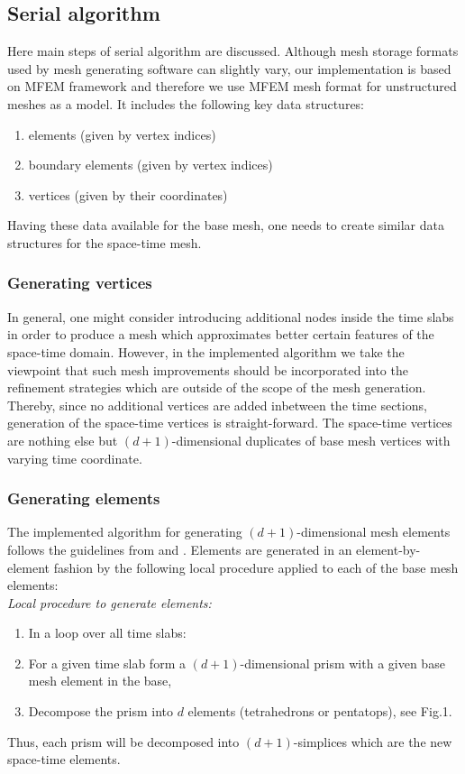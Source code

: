 \documentclass[12pt]{article}
\begin{document}
\subsection{Serial algorithm}
Here main steps of serial algorithm are discussed. Although mesh storage formats used by mesh generating software can slightly vary, our implementation is based on MFEM \cite{mfem} framework and therefore we use MFEM mesh format for unstructured meshes as a model. It includes the following key data structures: 
\begin{enumerate}
\item elements (given by vertex indices)
\item boundary elements (given by vertex indices)
\item vertices (given by their coordinates)
\end{enumerate}
Having these data available for the base mesh, one needs to create similar data structures for the space-time mesh. 

\subsubsection{Generating vertices}
In general, one might consider introducing additional nodes inside the time slabs \cite{Behr} in order to produce a mesh which approximates better certain features of the space-time domain. However, in the implemented algorithm we take the viewpoint that such mesh improvements should be incorporated into the refinement strategies which are outside of the scope of the mesh generation. 
Thereby, since no additional vertices are added inbetween the time sections, generation of the space-time vertices is straight-forward. The  space-time vertices are nothing else but $(d+1)$-dimensional duplicates of base mesh vertices with varying time coordinate.

\subsubsection{Generating elements}
The implemented algorithm for generating $(d+1)$-dimensional mesh elements follows the guidelines from \cite{Behr} and \cite{NeumuellerMeshgen}. Elements are generated in an element-by-element fashion by the following local procedure applied to each of the base mesh elements: \\
\textit{Local procedure to generate elements:}
\begin{enumerate}
	\item[] In a loop over all time slabs:
	\item For a given time slab form a $(d+1)$-dimensional prism with a given base mesh element in the base,
	\item Decompose the prism into $d$ elements (tetrahedrons or pentatops), see Fig.1.
\end{enumerate}
Thus, each  prism will be decomposed into $(d+1)$-simplices which are the new space-time elements.
\end{document}
